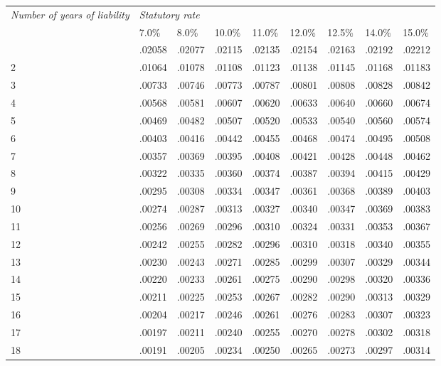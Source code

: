 \documentclass[12pt,a4paper]{article}
\begin{document}
{\footnotesize{}
\noindent
\begin{longtable}{p{33pt} llll llll}
\hline
\itshape \sloppy Number of years of liability&\multicolumn{7}{l}{\itshape Statutory rate}\\
&7$.$0\%& 8$.$0\%&10$.$0\%&11$.$0\%&12$.$0\%&12$.$5\%&14$.$0\%&15$.$0\%\\
\hline
\endhead
\hline
\endlastfoot
1&$.$02058&$.$02077&$.$02115&$.$02135&$.$02154&$.$02163&$.$02192&$.$02212\\
2&$.$01064&$.$01078&$.$01108&$.$01123&$.$01138&$.$01145&$.$01168&$.$01183\\
3&$.$00733&$.$00746&$.$00773&$.$00787&$.$00801&$.$00808&$.$00828&$.$00842\\	
4&$.$00568&$.$00581&$.$00607&$.$00620&$.$00633&$.$00640&$.$00660&$.$00674\\
5&$.$00469&$.$00482&$.$00507&$.$00520&$.$00533&$.$00540&$.$00560&$.$00574\\
6&$.$00403&$.$00416&$.$00442&$.$00455&$.$00468&$.$00474&$.$00495&$.$00508\\
7&$.$00357&$.$00369&$.$00395&$.$00408&$.$00421&$.$00428&$.$00448&$.$00462\\
8&$.$00322&$.$00335&$.$00360&$.$00374&$.$00387&$.$00394&$.$00415&$.$00429\\
9&$.$00295&$.$00308&$.$00334&$.$00347&$.$00361&$.$00368&$.$00389&$.$00403\\
10&$.$00274&$.$00287&$.$00313&$.$00327&$.$00340&$.$00347&$.$00369&$.$00383\\
11&$.$00256&$.$00269&$.$00296&$.$00310&$.$00324&$.$00331&$.$00353&$.$00367\\
12&$.$00242&$.$00255&$.$00282&$.$00296&$.$00310&$.$00318&$.$00340&$.$00355\\
13&$.$00230&$.$00243&$.$00271&$.$00285&$.$00299&$.$00307&$.$00329&$.$00344\\
14&$.$00220&$.$00233&$.$00261&$.$00275&$.$00290&$.$00298&$.$00320&$.$00336\\
15&$.$00211&$.$00225&$.$00253&$.$00267&$.$00282&$.$00290&$.$00313&$.$00329\\
16&$.$00204&$.$00217&$.$00246&$.$00261&$.$00276&$.$00283&$.$00307&$.$00323\\
17&$.$00197&$.$00211&$.$00240&$.$00255&$.$00270&$.$00278&$.$00302&$.$00318\\
18&$.$00191&$.$00205&$.$00234&$.$00250&$.$00265&$.$00273&$.$00297&$.$00314\\
\end{longtable}

}
\end{document}
